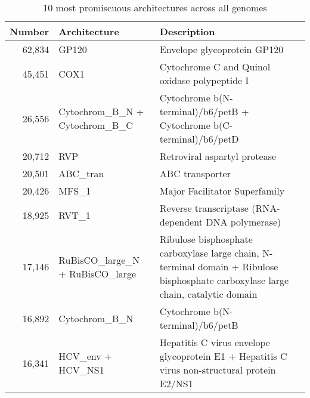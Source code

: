\begin{table}
	\begin{center}
		\sf
		\begin{tabular}{r p{} p{}}
			\textbf{Number} & \textbf{Architecture} & \textbf{Description} \\
			\hline
			62,834 & GP120           & Envelope glycoprotein GP120                                         \\ 
			45,451 & COX1            & Cytochrome C and Quinol oxidase polypeptide I                       \\ 
			26,556 & Cytochrom\_B\_N + \newline Cytochrom\_B\_C & Cytochrome b(N-terminal)/b6/petB + \newline Cytochrome b(C-terminal)/b6/petD                                                              \\ 
			20,712 & RVP             & Retroviral aspartyl protease                                        \\ 
			20,501 & ABC\_tran        & ABC transporter                                                     \\ 
			20,426 & MFS\_1           & Major Facilitator Superfamily                                       \\ 
			18,925 & RVT\_1           & Reverse transcriptase (RNA-dependent DNA polymerase)                \\ 
			17,146 & RuBisCO\_large\_N + \newline RuBisCO\_large & Ribulose bisphosphate carboxylase large chain, N-terminal domain + \newline Ribulose bisphosphate carboxylase large chain, catalytic domain                                                              \\ 
			16,892 & Cytochrom\_B\_N & Cytochrome b(N-terminal)/b6/petB                                    \\ 
			16,341 & HCV\_env + HCV\_NS1 & Hepatitis C virus envelope glycoprotein E1 + \newline Hepatitis C virus non-structural protein E2/NS1\\ 
			\hline
		\end{tabular}
		\caption{10 most promiscuous architectures across all genomes}
	\end{center}
\end{table}


